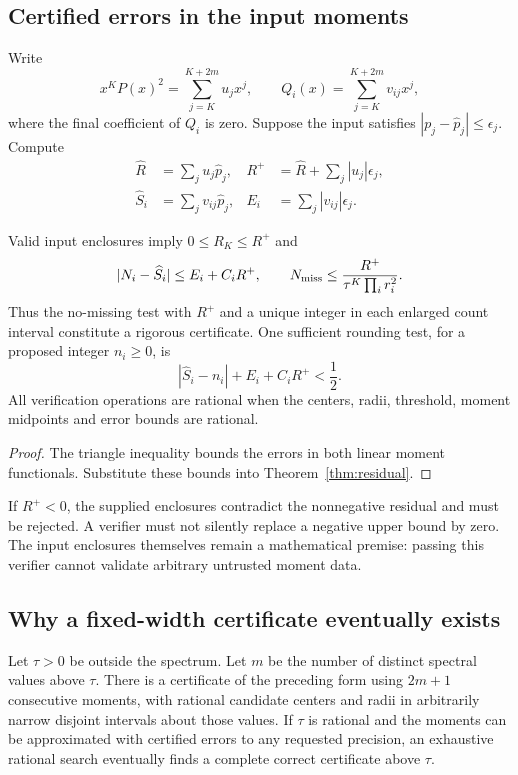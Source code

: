 \subsection{Certified errors in the input moments}

Write
\[
 x^KP(x)^2=\sum_{j=K}^{K+2m}u_jx^j,
 \qquad Q_i(x)=\sum_{j=K}^{K+2m}v_{ij}x^j,
\]
where the final coefficient of $Q_i$ is zero. Suppose the input satisfies
$|p_j-\widehat p_j|\le\epsilon_j$. Compute
\begin{align}
 \widehat R&=\sum_j u_j\widehat p_j,
 &R^+&=\widehat R+\sum_j|u_j|\epsilon_j,\\
 \widehat S_i&=\sum_jv_{ij}\widehat p_j,
 &E_i&=\sum_j|v_{ij}|\epsilon_j.
\end{align}

\begin{corollary}\label{cor:noise}
Valid input enclosures imply $0\le R_K\le R^+$ and
\[
 |N_i-\widehat S_i|\le E_i+C_iR^+,
 \qquad N_{\rm miss}\le\frac{R^+}{\tau^K\prod_i r_i^2}.
\]
Thus the no-missing test with $R^+$ and a unique integer in each enlarged
count interval constitute a rigorous certificate. One sufficient rounding
test, for a proposed integer $n_i\ge0$, is
\[
 |\widehat S_i-n_i|+E_i+C_iR^+<\frac12.
\]
All verification operations are rational when the centers, radii, threshold,
moment midpoints and error bounds are rational.
\end{corollary}
\begin{proof}
The triangle inequality bounds the errors in both linear moment functionals.
Substitute these bounds into Theorem~\ref{thm:residual}.
\end{proof}

If $R^+<0$, the supplied enclosures contradict the nonnegative residual and
must be rejected. A verifier must not silently replace a negative upper
bound by zero. The input enclosures themselves remain a mathematical
premise: passing this verifier cannot validate arbitrary untrusted moment
data.

\subsection{Why a fixed-width certificate eventually exists}

\begin{theorem}\label{thm:eventual}
Let $\tau>0$ be outside the spectrum. Let $m$ be the number of distinct
spectral values above $\tau$. There is a certificate of the preceding form
using $2m+1$ consecutive moments, with rational candidate centers and radii
in arbitrarily narrow disjoint intervals about those values. If $\tau$ is
rational and the moments can be approximated with certified errors to any
requested precision, an exhaustive rational search eventually finds a
complete correct certificate above $\tau$.
\end{theorem}

